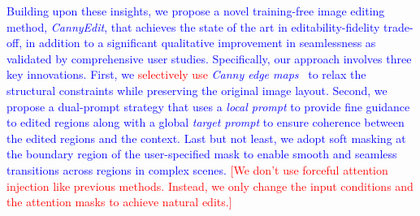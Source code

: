 \documentclass{article}
\newcommand{\kc}[1]{\textcolor{blue}{#1}}
\begin{document}
\kc{Building upon these insights, we propose a novel training-free image editing method, \emph{CannyEdit}, that achieves the state of the art in editability-fidelity trade-off, in addition to a significant qualitative improvement in seamlessness as validated by comprehensive user studies.
Specifically, our approach involves three key innovations.
First, we \textcolor{red}{selectively use} \emph{Canny edge maps}~\citep{canny1986computational} to relax the structural constraints while preserving the original image layout.
Second, we propose a dual-prompt strategy that uses a \emph{local prompt} to provide fine guidance to edited regions along with a global \emph{target prompt} to ensure coherence between the edited regions and the context.
Last but not least, we adopt soft masking at the boundary region of the user-specified mask to enable smooth and seamless transitions across regions in complex scenes. \textcolor{red}{[We don't use forceful attention injection like previous methods. Instead, we only change the input conditions and the attention masks to achieve natural edits.]}}


\end{document}
